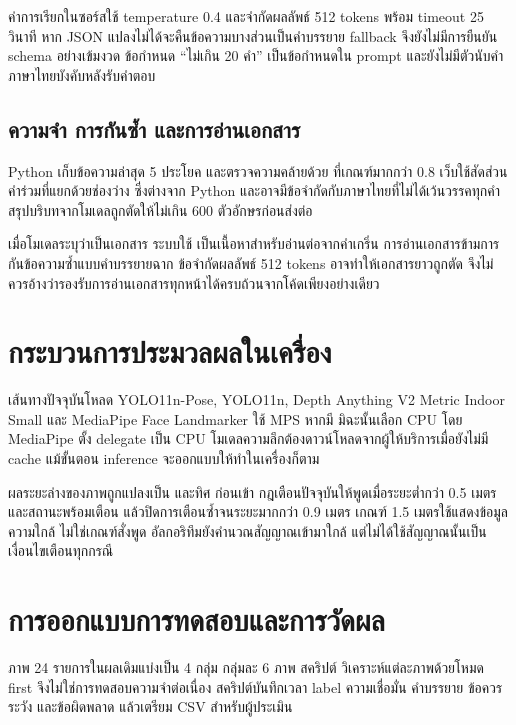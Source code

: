 ค่าการเรียกในซอร์สใช้ temperature 0.4 และจำกัดผลลัพธ์ 512 tokens พร้อม timeout 25 วินาที หาก JSON แปลงไม่ได้จะคืนข้อความบางส่วนเป็นคำบรรยาย fallback จึงยังไม่มีการยืนยัน schema อย่างเข้มงวด ข้อกำหนด ``ไม่เกิน 20 คำ'' เป็นข้อกำหนดใน prompt และยังไม่มีตัวนับคำภาษาไทยบังคับหลังรับคำตอบ

\subsection{ความจำ การกันซ้ำ และการอ่านเอกสาร}
Python เก็บข้อความล่าสุด 5 ประโยค และตรวจความคล้ายด้วย  ที่เกณฑ์มากกว่า 0.8 เว็บใช้สัดส่วนคำร่วมที่แยกด้วยช่องว่าง ซึ่งต่างจาก Python และอาจมีข้อจำกัดกับภาษาไทยที่ไม่ได้เว้นวรรคทุกคำ สรุปบริบทจากโมเดลถูกตัดให้ไม่เกิน 600 ตัวอักษรก่อนส่งต่อ

เมื่อโมเดลระบุว่าเป็นเอกสาร ระบบใช้  เป็นเนื้อหาสำหรับอ่านต่อจากคำเกริ่น การอ่านเอกสารข้ามการกันข้อความซ้ำแบบคำบรรยายฉาก ข้อจำกัดผลลัพธ์ 512 tokens อาจทำให้เอกสารยาวถูกตัด จึงไม่ควรอ้างว่ารองรับการอ่านเอกสารทุกหน้าได้ครบถ้วนจากโค้ดเพียงอย่างเดียว

\section{กระบวนการประมวลผลในเครื่อง}
เส้นทางปัจจุบันโหลด YOLO11n-Pose, YOLO11n, Depth Anything V2 Metric Indoor Small และ MediaPipe Face Landmarker ใช้ MPS หากมี มิฉะนั้นเลือก CPU โดย MediaPipe ตั้ง delegate เป็น CPU โมเดลความลึกต้องดาวน์โหลดจากผู้ให้บริการเมื่อยังไม่มี cache แม้ขั้นตอน inference จะออกแบบให้ทำในเครื่องก็ตาม

ผลระยะล่างของภาพถูกแปลงเป็น  และทิศ  ก่อนเข้า  กฎเตือนปัจจุบันให้พูดเมื่อระยะต่ำกว่า 0.5 เมตรและสถานะพร้อมเตือน แล้วปิดการเตือนซ้ำจนระยะมากกว่า 0.9 เมตร เกณฑ์ 1.5 เมตรใช้แสดงข้อมูลความใกล้ ไม่ใช่เกณฑ์สั่งพูด อัลกอริทึมยังคำนวณสัญญาณเข้ามาใกล้ แต่ไม่ได้ใช้สัญญาณนั้นเป็นเงื่อนไขเตือนทุกกรณี


\section{การออกแบบการทดสอบและการวัดผล}
ภาพ 24 รายการในผลเดิมแบ่งเป็น 4 กลุ่ม กลุ่มละ 6 ภาพ สคริปต์  วิเคราะห์แต่ละภาพด้วยโหมด first จึงไม่ใช่การทดสอบความจำต่อเนื่อง สคริปต์บันทึกเวลา label ความเชื่อมั่น คำบรรยาย ข้อควรระวัง และข้อผิดพลาด แล้วเตรียม CSV สำหรับผู้ประเมิน

